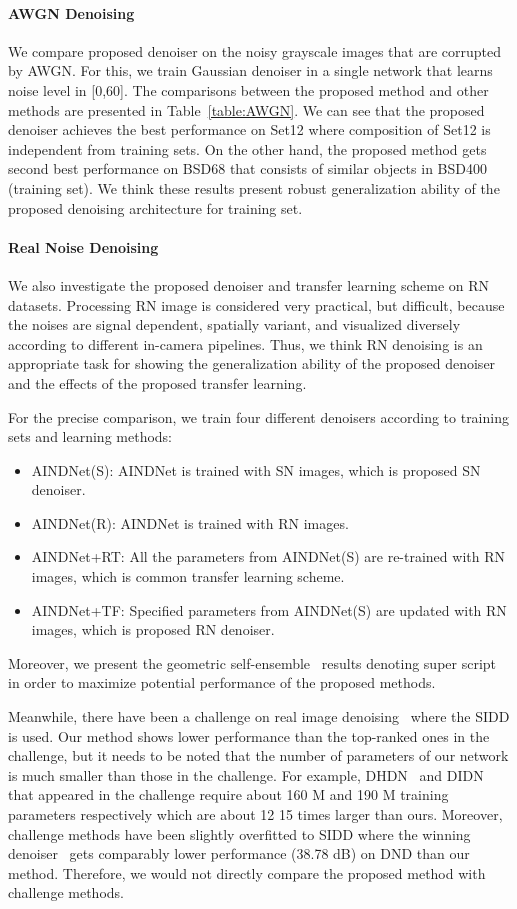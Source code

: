 \documentclass[10pt,twocolumn,letterpaper]{article}
\begin{document}
\paragraph{AWGN Denoising}
We compare proposed denoiser on the noisy grayscale images that are corrupted by AWGN.
For this, we train Gaussian denoiser in a single network that learns noise level in [0,60].
The comparisons between the proposed method and other methods are presented in Table~\ref{table:AWGN}.
We can see that the proposed denoiser achieves the best performance on Set12 where composition of Set12 is independent from training sets.
On the other hand, the proposed method gets second best performance on BSD68 that consists of similar objects in BSD400 (training set).  
We think these results present robust generalization ability of the proposed denoising architecture for training set.

\paragraph{Real Noise Denoising}
We also investigate the proposed denoiser and transfer learning scheme on RN datasets.
Processing RN image is considered very practical, but difficult, because the noises are signal dependent, spatially variant, and visualized diversely according to different in-camera pipelines. Thus, we think RN denoising is an appropriate task for showing the generalization ability of the proposed denoiser and the effects of the proposed transfer learning. 

For the precise comparison, we train four different denoisers according to training sets and learning methods:
\begin{itemize}
	\item AINDNet(S): AINDNet is trained with SN images, which is proposed SN denoiser.
	\item AINDNet(R): AINDNet is trained with RN images.	
	\item AINDNet+RT: All the parameters from AINDNet(S) are re-trained with RN images, which is common transfer learning scheme.		
	\item AINDNet+TF: Specified parameters from AINDNet(S) are updated with RN images, which is proposed RN denoiser.	
\end{itemize}
Moreover, we present the geometric self-ensemble~\cite{timofte2016seven} results denoting super script  in order to maximize potential performance of the proposed methods.

Meanwhile, there have been a challenge on real image denoising~\cite{abdelhamed2019ntire} where the SIDD is used.
Our method shows lower performance than the top-ranked ones in the challenge, but it needs to be noted that the number of parameters of our network is much smaller than those in the challenge.
For example, DHDN~\cite{park2019densely} and DIDN~\cite{yu2019deep} that appeared in the challenge require about 160 M and 190 M training parameters respectively which are about 12  15 times larger than ours.
Moreover, challenge methods have been slightly overfitted to SIDD where the winning denoiser~\cite{kim2019grdn} gets comparably lower performance (38.78 dB) on DND than our method. Therefore, we would not directly compare the proposed method with challenge methods.
 
\end{document}
